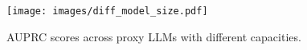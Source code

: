 \begin{figure}[t]
    \centering
    \texttt{[image: images/diff\_model\_size.pdf]}
    \caption{
    AUPRC scores across proxy LLMs with different capacities.
    }
    \label{fig:eval_model_size}
\end{figure}